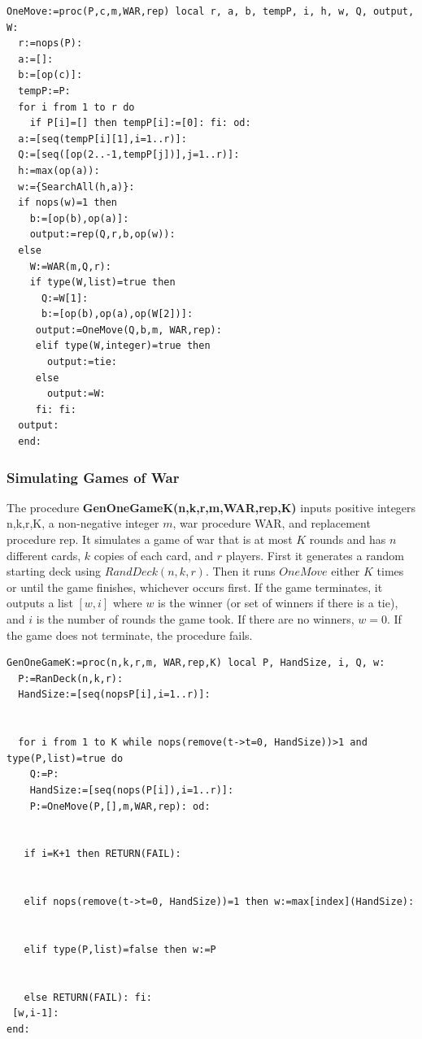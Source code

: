 \documentclass[12pt]{amsart}
\begin{document}
\begin{lstlisting}
OneMove:=proc(P,c,m,WAR,rep) local r, a, b, tempP, i, h, w, Q, output, W:
  r:=nops(P):
  a:=[]:
  b:=[op(c)]:
  tempP:=P:
  for i from 1 to r do
    if P[i]=[] then tempP[i]:=[0]: fi: od:
  a:=[seq(tempP[i][1],i=1..r)]:
  Q:=[seq([op(2..-1,tempP[j])],j=1..r)]:
  h:=max(op(a)):
  w:={SearchAll(h,a)}:
  if nops(w)=1 then
    b:=[op(b),op(a)]:
    output:=rep(Q,r,b,op(w)): 
  else
    W:=WAR(m,Q,r):
    if type(W,list)=true then
      Q:=W[1]:
      b:=[op(b),op(a),op(W[2])]: 
     output:=OneMove(Q,b,m, WAR,rep):
     elif type(W,integer)=true then
       output:=tie:
     else
       output:=W:
     fi: fi:
  output:
  end:
\end{lstlisting}


\subsubsection{Simulating Games of War}\hfill


The procedure \textbf{GenOneGameK(n,k,r,m,WAR,rep,K)} inputs positive integers n,k,r,K, a non-negative integer $m$, war procedure WAR, and replacement procedure rep. It simulates a game of war that is at most $K$ rounds and has $n$ different cards, $k$ copies of each card, and $r$ players. First it generates a random starting deck using $RandDeck(n,k,r)$. Then it runs $OneMove$ either $K$ times or until the game finishes, whichever occurs first. If the game terminates, it outputs a list $[w,i]$ where $w$ is the winner (or set of winners if there is a tie), and $i$ is the number of rounds the game took. If there are no winners, $w={0}.$ If the game does not terminate, the procedure fails. 


\begin{lstlisting}
GenOneGameK:=proc(n,k,r,m, WAR,rep,K) local P, HandSize, i, Q, w:
  P:=RanDeck(n,k,r):
  HandSize:=[seq(nopsP[i],i=1..r)]:


  for i from 1 to K while nops(remove(t->t=0, HandSize))>1 and type(P,list)=true do
    Q:=P:
    HandSize:=[seq(nops(P[i]),i=1..r)]:
    P:=OneMove(P,[],m,WAR,rep): od:


   if i=K+1 then RETURN(FAIL):


   elif nops(remove(t->t=0, HandSize))=1 then w:=max[index](HandSize):


   elif type(P,list)=false then w:=P


   else RETURN(FAIL): fi:
 [w,i-1]:
end:
\end{lstlisting}
\end{document}
